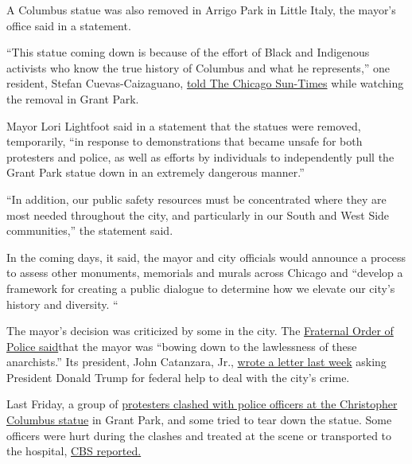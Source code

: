 A Columbus statue was also removed in Arrigo Park in Little Italy, the
mayor's office said in a statement.

``This statue coming down is because of the effort of Black and
Indigenous activists who know the true history of Columbus and what he
represents,'' one resident, Stefan Cuevas-Caizaguano,
\href{https://chicago.suntimes.com/news/2020/7/23/21336740/lightfoot-removal-statue-christopher-columbus-grant-park}{told
The Chicago Sun-Times} while watching the removal in Grant Park.

Mayor Lori Lightfoot said in a statement that the statues were removed,
temporarily, ``in response to demonstrations that became unsafe for both
protesters and police, as well as efforts by individuals to
independently pull the Grant Park statue down in an extremely dangerous
manner.''

``In addition, our public safety resources must be concentrated where
they are most needed throughout the city, and particularly in our South
and West Side communities,'' the statement said.

In the coming days, it said, the mayor and city officials would announce
a process to assess other monuments, memorials and murals across Chicago
and ``develop a framework for creating a public dialogue to determine
how we elevate our city's history and diversity. ``

The mayor's decision was criticized by some in the city. The
\href{https://www.facebookcorewwwi.onion/FOP7Chicago/?__tn__=kC-R\&eid=ARDGaMwhgZ1D-b82rynp7mzpxmD8mSlx632MprHtYFtl9O5hRx2De7OGcVC3Ys-yKJC2mmrLBGRQ0y8c\&hc_ref=ARQE0TO5AI8QvAXBmYKeYwi_DK8vnjLd01rLAwyR1b--Yt4bPX15cKeqJgEBCpd9qw8\&fref=nf\&__xts__\%5B0\%5D=68.ARCtJYtOOquzHvhALdZJKGfUs1E4Tab4e2MDtIXZNSTTQFKprhrC7QleYnckvgcwPixHhwjsRp0qjSQdMERA9lzMAslYkqOGXWNeKjdbVh0KpNIpntgGp8MTLGt1Id5YWi-OzQ6DRJygl8nMj7R7OyUtEfSmRQKVqg8uhQNdcwTx8rOeSEPEIHtzD-x4M9jBvdlbLWPToF4IVSKAnPNN32RSqvl8UeyPOexoVtKVz28heF7xuuNDvmrVKOMJNJEWngNzR5jxYbA-cRhdGOBblQfxeGa49ceQY61H2aRfeZD6UjryDqkXj82rWHVwdxOf9bNSCUvmBVS-ZavLeHJm7w}{Fraternal
Order of Police said}that the mayor was ``bowing down to the lawlessness
of these anarchists.'' Its president, John Catanzara, Jr.,
\href{https://www.facebookcorewwwi.onion/FOP7Chicago/photos/a.963693107007404/3311469208896437/?type=3\&theater}{wrote
a letter last week} asking President Donald Trump for federal help to
deal with the city's crime.

Last Friday, a group of \href{https://cbsloc.al/32qXo6d}{protesters
clashed with police officers at the Christopher Columbus statue} in
Grant Park, and some tried to tear down the statue. Some officers were
hurt during the clashes and treated at the scene or transported to the
hospital,
\href{https://chicago.cbslocal.com/2020/07/18/chicago-grant-park-columbus-statue-protest-cpd/}{CBS
reported.}

